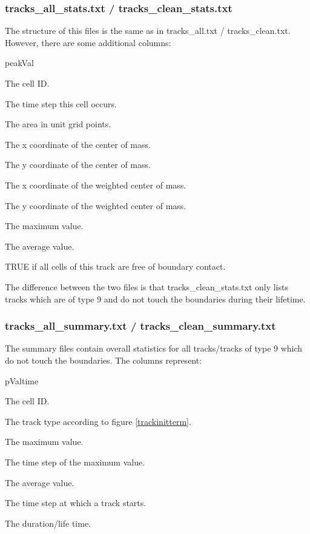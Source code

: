 \documentclass{scrartcl}
\begin{document}
\subsubsection{tracks\_all\_stats.txt / tracks\_clean\_stats.txt}
The structure of this files is the same as in tracks\_all.txt / tracks\_clean.txt. However, there are some additional columns:
\begin{labeling}{peakVal}
	\item[clID] The cell ID.
	\item[tsclID] The time step this cell occurs.
	\item[clarea] The area in unit grid points.
	\item[clcmassX] The x coordinate of the center of mass.
	\item[clcmassY] The y coordinate of the center of mass.
	\item[wclcmassX] The x coordinate of the weighted center of mass.
	\item[wclcmassY] The y coordinate of the weighted center of mass.
	\item[peakVal] The maximum value.
	\item[avVal] The average value.
	\item[nobound] TRUE if all cells of this track are free of boundary contact.
\end{labeling}
The difference between the two files is that tracks\_clean\_stats.txt only lists tracks which are of type 9 and do not touch the boundaries during their lifetime.

\subsubsection{tracks\_all\_summary.txt / tracks\_clean\_summary.txt}
The summary files contain overall statistics for all tracks/tracks of type 9 which do not touch the boundaries. The columns represent:
\begin{labeling}{pValtime}
	\item[trackID] The cell ID.
	\item[trType] The track type according to figure \ref{trackinitterm}.
	\item[peakVal] The maximum value.
	\item[pValtime] The time step of the maximum value.
	\item[avVal] The average value.	
	\item[start] The time step at which a track starts.
	\item[dur] The duration/life time.
\end{labeling}
\end{document}
